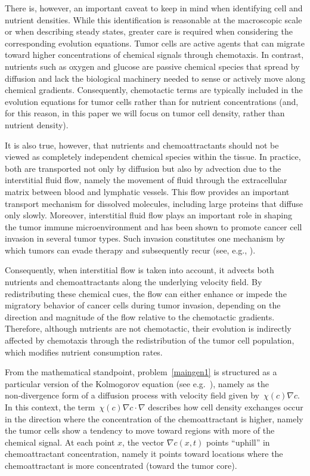 \documentclass[12pt,a4paper,intlimits,sumlimits]{amsart}
\theoremstyle{definition}
\theoremstyle{plain}
\numberwithin{equation}{section}
\begin{document}
There is, however, an important caveat to keep in mind when identifying cell and nutrient densities. While this identification is reasonable at the macroscopic scale or when describing steady states, greater care is required when considering the corresponding evolution equations. Tumor cells are active agents that can migrate toward higher concentrations of chemical signals through chemotaxis. In contrast, nutrients such as oxygen and glucose are passive chemical species that spread by diffusion and lack the biological machinery needed to sense or actively move along chemical gradients. Consequently, chemotactic terms are typically included in the evolution equations for tumor cells rather than for nutrient concentrations
(and, for this reason, in this paper we will focus on tumor cell density, rather than nutrient density).

It is also true, however, that nutrients and chemoattractants should not be viewed as completely independent chemical species within the tissue. In practice, both are transported not only by diffusion but also by advection due to the interstitial fluid flow, namely the movement of fluid through the extracellular matrix between blood and lymphatic vessels. This flow provides an important transport mechanism for dissolved molecules, including large proteins that diffuse only slowly.
Moreover, interstitial fluid flow plays an important role in shaping the tumor immune microenvironment and has been shown to promote cancer cell invasion in several tumor types. Such invasion constitutes one mechanism by which tumors can evade therapy and subsequently recur (see, e.g., \cite{PMC4144982}).

Consequently, when interstitial flow is taken into account, it advects both nutrients and chemoattractants along the underlying velocity field. By redistributing these chemical cues, the flow can either enhance or impede the migratory behavior of cancer cells during tumor invasion, depending on the direction and magnitude of the flow relative to the chemotactic gradients.
Therefore,
although nutrients are not chemotactic, their evolution is indirectly affected by chemotaxis through the redistribution of the tumor cell population, which modifies nutrient consumption rates.

{F}rom the mathematical standpoint, problem~\eqref{maingen1} is structured as a particular version of the Kolmogorov equation (see e.g.~\cite{MR2597943}), namely as the non‑divergence form of a diffusion process with velocity field given by~$ \chi(c) \nabla c$.
In this context, the term~$\chi(c) \nabla c\cdot\nabla$ describes how cell density exchanges occur in the direction where the concentration of the chemoattractant is higher, namely the tumor cells show a tendency to move toward regions with more of the chemical signal. 
At each point $x$, the vector $\nabla c(x,t)$ points ``uphill'' in chemoattractant concentration, namely it points toward locations where the chemoattractant is more concentrated (toward the tumor core).
\end{document}
